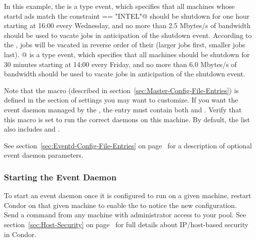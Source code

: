 In this example, the \verb@TestEvent@ is a  type event, which
specifies that all machines whose startd ads match the constraint
\verb@Arch == "INTEL"@ should be shutdown for one hour starting at
16:00 every Wednesday, and no more than 2.5 Mbytes/s of bandwidth
should be used to vacate jobs in anticipation of the shutdown
event.  According to the \verb@TestEventRank@, jobs will be vacated in
reverse order of their  (larger jobs first, smaller jobs
last).  @ is a  type event, which specifies
that all machines should be shutdown for 30 minutes starting at
14:00 every Friday, and no more than 6.0 Mbytes/s of bandwidth should
be used to vacate jobs in anticipation of the shutdown event.

Note that the  macro (described in
section~\ref{sec:Master-Config-File-Entries}) is defined in the
section of settings you may want to customize.
If you want the event daemon managed by the , the
 entry must contain both 
 and .
Verify that this macro is set to run the correct daemons on
this machine.  By default, the list also includes
 and .

See section~\ref{sec:Eventd-Config-File-Entries} on
page~\pageref{sec:Eventd-Config-File-Entries} for a description of
optional event daemon parameters.

\subsubsection{\label{sec:Start-EventD} 
Starting the Event Daemon} 

To start an event daemon once it is configured to run on a given
machine, restart Condor on that given machine to enable
the  to notice the new configuration.
Send a  command from any machine
with administrator access to your pool.
See section~\ref{sec:Host-Security} on
page~\pageref{sec:Host-Security} for full details about IP/host-based
security in Condor.

